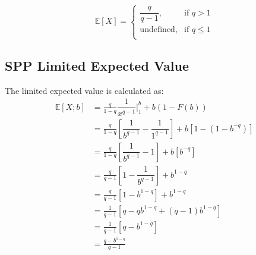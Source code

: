 \documentclass[]{article} %
\begin{document}
\begin{equation}
\mathbb{E}[X]  = 
\begin{cases}
\dfrac{q}{q-1},& \text{if } q > 1\\
\text{undefined},& \text{if } q \leq 1\\         
\end{cases}
\end{equation}

\subsection{SPP Limited Expected Value}\label{ParetoLEV}
The limited expected value is calculated as:
\begin{align}
	\mathbb{E}[X;b] 	&= \frac{q}{1-q} \dfrac{1}{x^{q-1}} \Big|_{1}^{b} + b  (1-F(b))\nonumber\\
 	&=  \frac{q}{1-q} \left[ \dfrac{1}{b^{q-1}} - \dfrac{1}{1^{q-1}}\right]+  b  \left[1-(1-b^{-q})\right]\nonumber\\
 	&=  \frac{q}{1-q} \left[ \dfrac{1}{b^{q-1}} - 1\right]+  b  \left[b^{-q}\right]\nonumber\\
 	&=  \frac{q}{q-1} \left[1 - \dfrac{1}{b^{q-1}}\right]+ b^{1-q}\nonumber\\
 	&=  \frac{q}{q-1} \left[1 - b^{1-q}\right]+b^{1-q}\\ %
 	&=  \frac{1}{q-1} \left[q - qb^{1-q} + (q-1)b^{1-q}\right]\nonumber\\
 	&=  \frac{1}{q-1} \left[q - b^{1-q}\right]\nonumber\\
 	&=	\frac{q - b^{1-q}}{q-1}
 \end{align}
 \newpage
\end{document}
